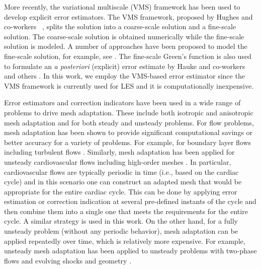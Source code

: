 More recently, the variational multiscale (VMS) framework has been used to develop explicit error estimators. 
The VMS framework, proposed by Hughes and co-workers ~\cite{hughes1995multiscale,hughes1998variational}, splits the solution into a coarse-scale solution and a fine-scale solution. 
The coarse-scale solution is obtained numerically while the fine-scale solution is modeled. 
A number of approaches have been proposed to model the fine-scale solution, for example, see \cite{brezzi1997b,brezzi1992relationship,brezzi1994choosing,codina2002stabilized,hughes2007variational,principe2010stabilization}. 
The fine-scale Green's function is also used to formulate an \textit{a posteriori} (explicit) error estimate by Hauke and co-workers \cite{hauke2006proper,hauke2006multiscale,hauke2008variational,hauke2012mesh,hauke2014recent,hauke2015variational,irisarri2016posteriori} and others \cite{bayona2018variational}.
In this work, we employ the VMS-based error estimator
since the VMS framework is currently used for LES and it is computationally inexpensive.

Error estimators and correction indicators have been used in a wide range of problems to drive mesh adaptation. These include both isotropic and anisotropic mesh adaptation and for both steady and unsteady problems. For flow problems, mesh adaptation has been shown to provide significant computational savings or better accuracy for a variety of problems. For example, for boundary layer flows \cite{Sahni2008,bib:Sahni2017_adapt} including turbulent flows \cite{bib:Chitale2015}. Similarly, mesh adaptation has been applied for unsteady cardiovascular flows  \cite{SAHNI20065634,bib:Muller2005,bib:Sahni2009} including high-order meshes \cite{bib:Sahni2010}. In particular, cardiovascular flows are typically periodic in time (i.e., based on the cardiac cycle) and in this scenario one can construct an adapted mesh that would be appropriate for the entire cardiac cycle. This can be done by applying error estimation or correction indication at several pre-defined instants of the cycle and then combine them into a single one that meets the requirements for the entire cycle. A similar strategy is used in this work. On the other hand, for a fully unsteady problem (without any periodic behavior), mesh adaptation can be applied repeatedly over time, which is relatively more expensive. For example, unsteady mesh adaptation has been applied to unsteady problems with two-phase flows \cite{bib:rodriguez2013} and evolving shocks and geometry \cite{bib:Yang2021}.



